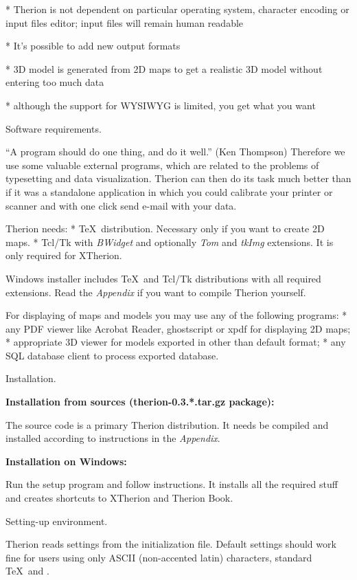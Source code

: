 * Therion is not dependent on particular operating system, character encoding
  or input files editor; input files will remain human readable

* It's possible to add new output formats

* 3D model is generated from 2D maps to get a realistic 3D model 
  without entering too much data

* although the support for WYSIWYG is limited, you get what you want
\endlist

\subchapter Software requirements.

``A program should do one thing, and do it well.'' (Ken Thompson) 
Therefore we use some valuable external programs, which are related to the 
problems of typesetting and data visualization. Therion can then do its task 
much better than if it was a standalone application in which you could calibrate 
your printer or scanner and with one click send e-mail with your data.

Therion needs:
\list
* \TeX\ distribution.
  Necessary only if you want to create 2D maps.
* Tcl/Tk with {\it BWidget} and optionally {\it Tom} and {\it tkImg} 
  extensions. It is only required for XTherion.
\endlist

Windows installer includes \TeX\ and Tcl/Tk distributions with all required 
extensions. Read the {\it Appendix} if you want to compile Therion yourself.

For displaying of maps and models you may use any of the following programs:
\list
* any PDF viewer like Acrobat Reader, ghostscript or xpdf for displaying  
  2D maps;
* appropriate 3D viewer for models exported in other than default format;
* any SQL database client to process exported database.
\endlist


\subchapter Installation.

{\bf Installation from sources (therion-0.3.*.tar.gz package):}

The source code is a primary Therion distribution. It needs be compiled 
and installed according to instructions in the {\it Appendix}.

{\bf Installation on Windows:}

Run the setup program and follow instructions. It installs all the required 
stuff and creates shortcuts to XTherion and Therion Book.


\subsubchapter Setting-up environment.

Therion reads settings from the initialization file. Default settings should 
work fine for users using only ASCII (non-accented latin) characters, 
standard \TeX\ and \MP. 

